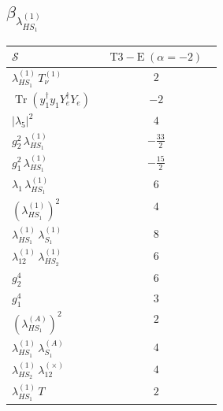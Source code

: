 \documentclass[9pt]{article}
\begin{document}
\subsection*{$ \beta_{\lambda_{HS_1}^{(1)}} $}
\begin{longtable}{@{}p{0.31\linewidth}c@{}}
\toprule
$\mathcal{S}$ & $ \mathrm{T3-E}\;(\alpha=-2) $ \\
\midrule
$ \lambda_{HS_1}^{(1)}\,T_{\nu}^{(1)} $ & $ 2 $ \\
$ \operatorname{Tr}(y_1^\dagger y_1Y_e^\dagger Y_e) $ & $ -2 $ \\
$ |\lambda_5|^2 $ & $ 4 $ \\
$ g_2^2\,\lambda_{HS_1}^{(1)} $ & $ - \frac{33}{2} $ \\
$ g_1^2\,\lambda_{HS_1}^{(1)} $ & $ - \frac{15}{2} $ \\
$ \lambda_1\,\lambda_{HS_1}^{(1)} $ & $ 6 $ \\
$ \left(\lambda_{HS_1}^{(1)}\right)^2 $ & $ 4 $ \\
$ \lambda_{HS_1}^{(1)}\,\lambda_{S_1}^{(1)} $ & $ 8 $ \\
$ \lambda_{12}^{(1)}\,\lambda_{HS_2}^{(1)} $ & $ 6 $ \\
$ g_2^4 $ & $ 6 $ \\
$ g_1^4 $ & $ 3 $ \\
$ \left(\lambda_{HS_1}^{(A)}\right)^2 $ & $ 2 $ \\
$ \lambda_{HS_1}^{(1)}\,\lambda_{S_1}^{(A)} $ & $ 4 $ \\
$ \lambda_{HS_2}^{(1)}\,\lambda_{12}^{(\times)} $ & $ 4 $ \\
$ \lambda_{HS_1}^{(1)}\,T $ & $ 2 $ \\
\bottomrule
\end{longtable}
\end{document}
